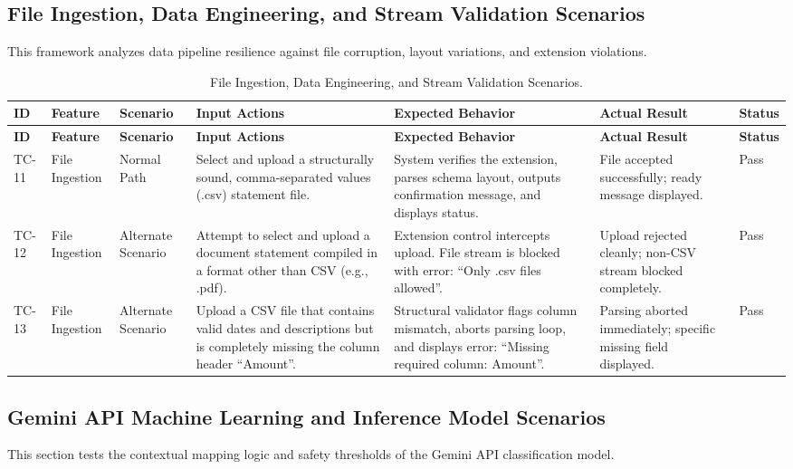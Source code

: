 \subsection{File Ingestion, Data Engineering, and Stream Validation Scenarios}
This framework analyzes data pipeline resilience against file corruption, layout variations, and extension violations.

\begingroup
\setlength{\tabcolsep}{3pt}
\renewcommand{\arraystretch}{1.3}
\begin{longtable}{|p{0.9cm}|>{\raggedright\arraybackslash}p{1.7cm}|>{\raggedright\arraybackslash}p{1.5cm}|>{\raggedright\arraybackslash}p{3.3cm}|>{\raggedright\arraybackslash}p{3.3cm}|>{\raggedright\arraybackslash}p{1.9cm}|>{\raggedright\arraybackslash}p{1.2cm}|}
	\caption{File Ingestion, Data Engineering, and Stream Validation Scenarios.}
	\label{tab:tc_ingestion}\\
	\hline
	\textbf{ID} & \textbf{Feature} & \textbf{Scenario} & \textbf{Input Actions} & \textbf{Expected Behavior} & \textbf{Actual Result} & \textbf{Status} \\ \hline
	\endfirsthead
	\hline
	\textbf{ID} & \textbf{Feature} & \textbf{Scenario} & \textbf{Input Actions} & \textbf{Expected Behavior} & \textbf{Actual Result} & \textbf{Status} \\ \hline
	\endhead
	TC-11 & File Ingestion & Normal Path & Select and upload a structurally sound, comma-separated values (.csv) statement file. & System verifies the extension, parses schema layout, outputs confirmation message, and displays status. & File accepted successfully; ready message displayed. & Pass \\ \hline
	TC-12 & File Ingestion & Alternate Scenario & Attempt to select and upload a document statement compiled in a format other than CSV (e.g., .pdf). & Extension control intercepts upload. File stream is blocked with error: ``Only .csv files allowed''. & Upload rejected cleanly; non-CSV stream blocked completely. & Pass \\ \hline
	TC-13 & File Ingestion & Alternate Scenario & Upload a CSV file that contains valid dates and descriptions but is completely missing the column header ``Amount''. & Structural validator flags column mismatch, aborts parsing loop, and displays error: ``Missing required column: Amount''. & Parsing aborted immediately; specific missing field displayed. & Pass \\ \hline
\end{longtable}
\endgroup

\subsection{Gemini API Machine Learning and Inference Model Scenarios}
This section tests the contextual mapping logic and safety thresholds of the Gemini API classification model.

